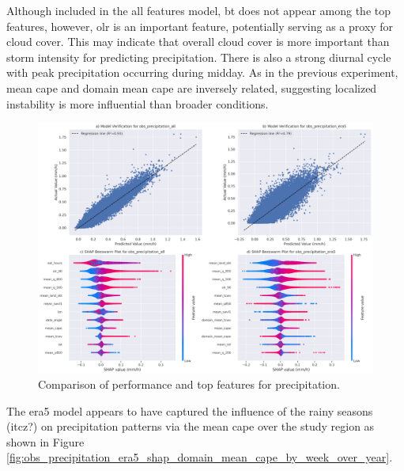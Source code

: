 Although included in the all features model, \acrfull{bt} does not appear among the top features, however, \acrfull{olr} is an important feature, potentially serving as a proxy for cloud cover. This may indicate that overall cloud cover is more important than storm intensity for predicting precipitation. There is also a strong diurnal cycle with peak precipitation occurring during midday. As in the previous experiment, mean \acrshort{cape} and domain mean \acrshort{cape} are inversely related, suggesting localized instability is more influential than broader conditions.

\begin{figure}[ht]
    \centering
    \includegraphics[width=\textwidth]{../figures/generated/experiments/obs_precipitation/obs_precipitation_summary.png}
    \caption{Comparison of performance and top features for precipitation.}
    \label{fig:obs_precipitation_summary}
\end{figure}

The \acrshort{era5} model appears to have captured the influence of the rainy seasons (\acrshort{itcz}?) on precipitation patterns via the mean \acrshort{cape} over the study region as shown in Figure \ref{fig:obs_precipitation_era5_shap_domain_mean_cape_by_week_over_year}.

